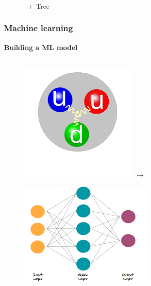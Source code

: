 \documentclass[aspectratio=43]{beamer}
\begin{document}
\begin{frame}
\begin{figure}
		\endminipage
		\hspace*{0.75cm}
		$\longrightarrow$
		{\color{darkgreen}Tree \checkmark}
		\endminipage
		
	\end{figure}

\end{frame}

\begin{frame}

	\frametitle{Machine learning}
	\framesubtitle{Building a ML model}
	
	\begin{figure}
		
		\begin{columns}
			\includegraphics[width = \linewidth]{plots/proton.png}
			$\longrightarrow$
		\end{columns}
		\endminipage
		\hspace*{-1.25cm}	
		\includegraphics[width = 1.25\linewidth]{plots/NN.png}

\end{figure}
\end{frame}
\end{document}
